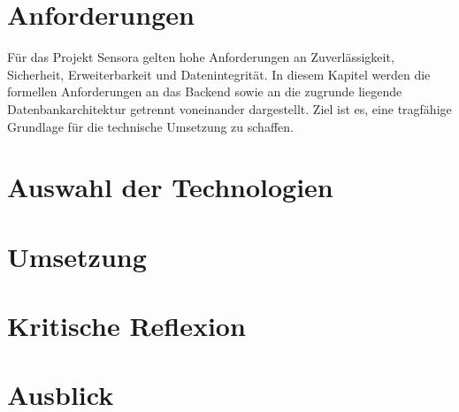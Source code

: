 \documentclass[a4paper,12pt]{report}
\begin{document}
	\newpage
	
	\chapter{Anforderungen}
	
    Für das Projekt Sensora gelten hohe Anforderungen an Zuverlässigkeit, Sicherheit, Erweiterbarkeit und Datenintegrität. In diesem Kapitel werden die formellen Anforderungen an das Backend sowie an die zugrunde liegende Datenbankarchitektur getrennt voneinander dargestellt. Ziel ist es, eine tragfähige Grundlage für die technische Umsetzung zu schaffen.
	
	
	\newpage
	
	\chapter{Auswahl der Technologien}
	
	
	
	
	
	
	
	
	\newpage
	
	\chapter{Umsetzung}
	
	
	
	
	
	
	\newpage

	
	
	\chapter{Kritische Reflexion}
	
	
	\newpage 
	
	\chapter{Ausblick}
	
	
\end{document}
